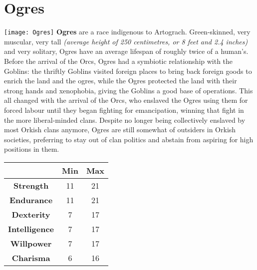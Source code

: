 \documentclass[openany,10pt,a4paper]{book}
\begin{document}
\section{Ogres}
\texttt{[image: Ogres]}\newline
\textbf{Ogres} are a race indigenous to Artograch. Green-skinned, very muscular, very tall \textit{(average height of 250 centimetres, or 8 feet and 2.4 inches)} and very solitary, Ogres have an average lifespan of roughly twice of a human's. Before the arrival of the Orcs, Ogres had a symbiotic relationship with the Goblins: the thriftly Goblins visited foreign places to bring back foreign goods to enrich the land and the ogres, while the Ogres protected the land with their strong hands and xenophobia, giving the Goblins a good base of operations. This all changed with the arrival of the Orcs, who enslaved the Ogres using them for forced labour until they began fighting for emancipation, winning that fight in the more liberal-minded clans. Despite no longer being collectively enslaved by most Orkish clans anymore, Ogres are still somewhat of outsiders in Orkish societies, preferring to stay out of clan politics and abstain from aspiring for high positions in them.\newline
\begin{tabular}{|c|c|c|}
\hline
 & \textbf{Min} & \textbf{Max} \\ \hline
\textbf{Strength} & 11 & 21 \\ \hline
\textbf{Endurance} & 11 & 21 \\ \hline
\textbf{Dexterity} & 7 & 17 \\ \hline
\textbf{Intelligence} & 7 & 17 \\ \hline
\textbf{Willpower} & 7 & 17 \\ \hline
\textbf{Charisma} & 6 & 16 \\ \hline
\end{tabular}\newline
{}\newpage
\end{document}
